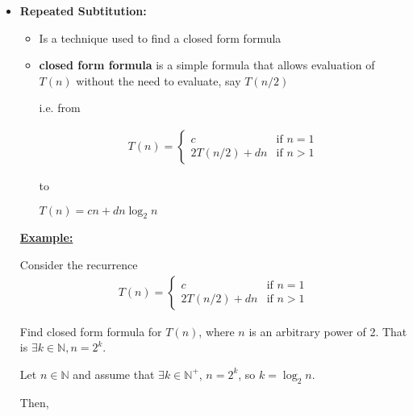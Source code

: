 \documentclass[12pt]{article}
\begin{document}
\begin{itemize}
    \item \textbf{Repeated Subtitution:}

    \begin{itemize}
        \item Is a technique used to find a closed form formula
        \item \textbf{closed form formula} is a simple formula that allows evaluation
        of $T(n)$ without the need to evaluate, say $T(n/2)$

        \bigskip

        i.e. from

        \begin{align}
            T(n) =
            \begin{cases}
            c & \text{if $n = 1$}\\
            2T(n/2) + dn & \text{if $n > 1$}
            \end{cases}
        \end{align}

        to

        \bigskip

        $T(n) = cn + dn \log_2 n$
    \end{itemize}

    \bigskip

    \begin{mdframed}
        \underline{\textbf{Example:}}

        \bigskip

        Consider the recurrence
        \setcounter{equation}{0}
        \begin{align}
            T(n) =
            \begin{cases}
            c & \text{if $n = 1$}\\
            2T(n/2) + dn & \text{if $n > 1$}
            \end{cases}
        \end{align}

        Find closed form formula for $T(n)$, where $n$ is an arbitrary power of 2.
        That is $\exists k \in \mathbb{N}, n = 2^k$.

        \bigskip

        Let $n \in \mathbb{N}$ and assume that $\exists k \in \mathbb{N}^+$, $n = 2^k$, so $k = \log_2 n$.

        \bigskip

        Then,


\end{mdframed}
\end{itemize}
\end{document}
